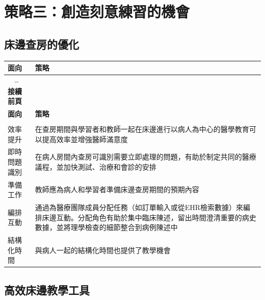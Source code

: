 \documentclass[12pt,a4paper]{article}
\begin{document}
\section{策略三：創造刻意練習的機會}

\subsection{床邊查房的優化}

\begin{longtable}{>{\raggedright\arraybackslash}p{4cm} >{\raggedright\arraybackslash}p{11cm}}
\toprule
\textbf{\textcolor{emergency_blue}{面向}} & \textbf{\textcolor{emergency_blue}{策略}} \\
\midrule
\endfirsthead

\multicolumn{2}{c}%
{{\bfseries \tablename\ \thetable{} -- 接續前頁}} \\
\toprule
\textbf{\textcolor{emergency_blue}{面向}} & \textbf{\textcolor{emergency_blue}{策略}} \\
\midrule
\endhead

\midrule \multicolumn{2}{r}{{接續下頁}} \\ \midrule
\endfoot

\bottomrule
\endlastfoot

\textcolor{emergency_red}{效率提升} & 在查房期間與學習者和教師一起在床邊進行以病人為中心的醫學教育可以提高效率並增強醫師滿意度 \\

\textcolor{emergency_red}{即時問題識別} & 在病人房間內查房可識別需要立即處理的問題，有助於制定共同的醫療議程，並加快測試、治療和會診的安排 \\

\textcolor{emergency_red}{準備工作} & 教師應為病人和學習者準備床邊查房期間的預期內容 \\

\textcolor{emergency_red}{編排互動} & 通過為醫療團隊成員分配任務（如訂單輸入或從EHR檢索數據）來編排床邊互動。分配角色有助於集中臨床陳述，留出時間澄清重要的病史數據，並將理學檢查的細節整合到病例陳述中 \\

\textcolor{emergency_red}{結構化時間} & 與病人一起的結構化時間也提供了教學機會 \\
\end{longtable}

\subsection{高效床邊教學工具}
\end{document}
